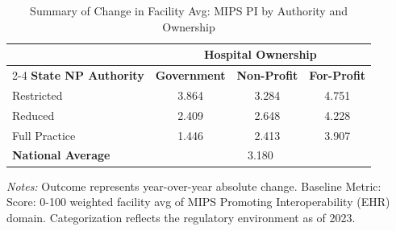 \begin{table}[htbp]
    \centering
    \caption{Summary of Change in Facility Avg: MIPS PI by Authority and Ownership}
    \label{tab:d_mips_pi_score_own}
    \vspace{0.2cm}
    \begin{tabular}{lccc}
        \toprule
        & \multicolumn{3}{c}{\textbf{Hospital Ownership}} \\
        \cmidrule(lr){2-4}
        \textbf{State NP Authority} & \textbf{Government} & \textbf{Non-Profit} & \textbf{For-Profit} \\
        \midrule
        Restricted & 3.864 & 3.284 & 4.751 \\
        Reduced & 2.409 & 2.648 & 4.228 \\
        Full Practice & 1.446 & 2.413 & 3.907 \\
        \midrule
        \textbf{National Average} & \multicolumn{3}{c}{3.180} \\
        \bottomrule
    \end{tabular}
    \vspace{0.1cm}
    \begin{minipage}{0.85\textwidth}
        \footnotesize \textit{Notes:} Outcome represents year-over-year absolute change. Baseline Metric: Score: 0-100 weighted facility avg of MIPS Promoting Interoperability (EHR) domain. Categorization reflects the regulatory environment as of 2023.
    \end{minipage}
\end{table}